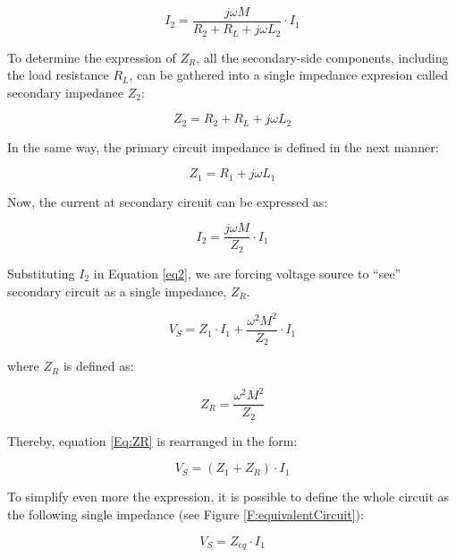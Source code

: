 \begin{equation}
	I_2 = \frac{j\omega{M}}{R_2+R_L+j\omega{L_2}}\cdot{I_1}
\end{equation}

To determine the expression of $Z_R$, all the secondary-side components, including the load resistance $R_L$, can be gathered into a single impedance expresion called secondary impedance $Z_2$:

\begin{equation}
	Z_2 = R_2+R_L+j\omega{L_2}
\end{equation}

In the same way, the primary circuit impedance is defined in the next manner:

\begin{equation}
	Z_1 = R_1+j\omega{L_1}
\end{equation}

Now, the current at secondary circuit can be expressed as:

\begin{equation} \label{eq:I2}
	I_2 = \frac{j\omega{M}}{Z_2}\cdot{I_1}
\end{equation}

Substituting $I_2$ in Equation \ref{eq2}, we are forcing voltage source to ``see'' secondary circuit as a single impedance, $Z_R$.

\begin{equation} \label{Eq:ZR}
	V_S = Z_1\cdot{I_1}+\frac{\omega^2{M^2}}{Z_2}\cdot{I_1} 
\end{equation}

where $Z_R$ is defined as:

\begin{equation}
	Z_R = \frac{\omega^2M^2}{Z_2}
\end{equation}

Thereby, equation \ref{Eq:ZR} is rearranged in the form:

\begin{equation}
	V_S =(Z_1+Z_R)\cdot{I_1}
\end{equation}

To simplify even more the expression, it is possible to define the whole circuit as the following single impedance (see Figure \ref{F:equivalentCircuit}):

\begin{equation}
	V_S = Z_{eq}\cdot{I_1}
\end{equation}


